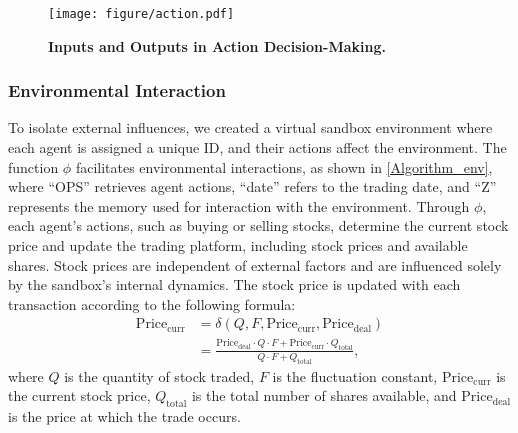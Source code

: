 \begin{figure}[ht]
	\centering
	\texttt{[image: figure/action.pdf]} 
	\caption{\textbf{Inputs and Outputs in Action Decision-Making.}}
 	\label{action}
\end{figure}

\subsubsection{Environmental Interaction}
\label{apppendix_Enxir_inteusedraction}

To isolate external influences, we created a virtual sandbox environment where each agent is assigned a unique ID, and their actions affect the environment. The function $\phi$ facilitates environmental interactions, as shown in \autoref{Algorithm_env}, where ``OPS'' retrieves agent actions, ``date'' refers to the trading date, and ``Z'' represents the memory used for interaction with the environment. Through $\phi$, each agent's actions, such as buying or selling stocks, determine the current stock price and update the trading platform, including stock prices and available shares. Stock prices are independent of external factors and are influenced solely by the sandbox's internal dynamics. The stock price is updated with each transaction according to the following formula:
\begin{equation}\label{price_update}
 	\begin{aligned}
 	\mathrm{Price}_{\mathrm{curr}} & = \delta \left(Q, F, \mathrm{Price}_{\mathrm{curr}}, \mathrm{Price}_{\mathrm{deal}} \right) \\
 	 & = \frac{\mathrm{Price}_{\mathrm{deal}} \cdot Q \cdot F + \mathrm{Price}_{\mathrm{curr}} \cdot Q_{\mathrm{total}}}{Q \cdot F + Q_{\mathrm{total}}},
 	\end{aligned} 
\end{equation}
where $Q$ is the quantity of stock traded, $F$ is the fluctuation constant, $\mathrm{Price}_{\mathrm{curr}}$ is the current stock price, $Q_{\mathrm{total}}$ is the total number of shares available, and $\mathrm{Price}_{\mathrm{deal}}$ is the price at which the trade occurs. 

\SetAlFnt{\small}

